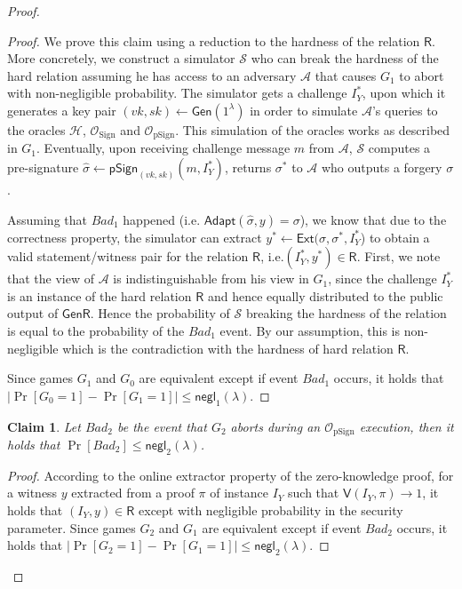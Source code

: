 \documentclass{llncs}
\newtheorem{Claim}{Claim}
\begin{document}
\begin{proof}
\begin{proof}
We prove this claim using a reduction to the hardness of the relation $\mathsf{R}$. More concretely, we construct a simulator $\mathcal{S}$ who can break the hardness of the hard relation assuming he has access to an adversary $\mathcal{A}$ that causes $G_1$ to abort with non-negligible probability. The simulator gets a challenge $I_Y^*$, upon which it generates a key pair $(vk, sk )\leftarrow \mathsf{Gen}(1^\lambda)$ in order to simulate $\mathcal{A}$’s queries to the oracles $\mathcal{H}$, $\mathcal{O}_{\text{Sign}}$ and $\mathcal{O}_{\text{pSign}}$. This simulation of the oracles works as described in $G_1$. Eventually, upon receiving challenge message $m$ from $\mathcal{A}$, $\mathcal{S}$ computes a pre-signature $\hat{\sigma}\leftarrow \mathsf{pSign}_{(vk,sk)}(m, I_Y^*)$, returns $\sigma^*$ to $\mathcal{A}$ who outputs a forgery $\sigma$. 

Assuming that $Bad_1$ happened (i.e. $\mathsf{Adapt}(\hat{\sigma},y) = \sigma$), we know that due to the correctness property, the simulator can extract $y^*\leftarrow\mathsf{Ext}(\sigma, \sigma^*, I_Y^*$) to obtain a valid statement/witness pair for the relation $\mathsf{R}$, i.e.$(I_Y^*, y^*)\in \mathsf{R}$.
First, we note that the view of $\mathcal{A}$ is indistinguishable from his view in $G_1$, since the challenge $I_Y^*$ is an instance of the hard relation $\mathsf{R}$ and hence equally distributed to the public output of $\mathsf{GenR}$. Hence the probability of $\mathcal{S}$ breaking the hardness of the relation is equal to the probability of the $Bad_1$ event. By our assumption, this is non-negligible which is the contradiction with the hardness of hard relation $\mathsf{R}$.  

Since games $G_1$ and $G_0$ are equivalent except if event $Bad_1$ occurs, it holds that 
$|\Pr[G_0 = 1]-\Pr[G_1 = 1]|\leq \mathsf{negl}_1(\lambda)$.
\end{proof}

\begin{Claim}
Let $Bad_2$ be the event that $G_2$ aborts during an $\mathcal{O}_{\text{pSign}}$ execution, then it holds that 
$\Pr[Bad_2] \leq \mathsf{negl}_2(\lambda)$.
\end{Claim}

\begin{proof}
According to the online extractor property of the zero-knowledge proof, for a witness $y$ extracted from a proof $\pi$ of instance $I_Y$ such that $\mathsf{V}(I_Y, \pi) \rightarrow 1$, it holds that $(I_Y, y) \in \mathsf{R}$ except with negligible probability in the security parameter. Since games $G_2$ and $G_1$ are equivalent except if event $Bad_2$ occurs, it holds that 
$|\Pr[G_2 = 1] - \Pr[G_1 = 1]|\leq \mathsf{negl}_2(\lambda).$
\end{proof}


\end{proof}
\end{document}

